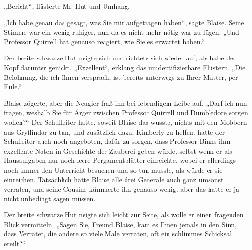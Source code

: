 „Bericht“, flüsterte Mr~Hut-und-Umhang.

„Ich habe genau das gesagt, was Sie mir aufgetragen haben“, sagte Blaise. Seine Stimme war ein wenig ruhiger, nun da es nicht mehr nötig war zu lügen.
„Und Professor Quirrell hat genauso reagiert, wie Sie es erwartet haben.“

Der breite schwarze Hut neigte sich und richtete sich wieder auf, als habe der Kopf darunter genickt.
„Exzellent“, erklang das unidentifizierbare Flüstern.
„Die Belohnung, die ich Ihnen versprach, ist bereits unterwegs zu Ihrer Mutter, per Eule.“

Blaise zögerte, aber die Neugier fraß ihn bei lebendigem Leibe auf.
„Darf ich nun fragen, weshalb Sie für Ärger zwischen Professor Quirrell und Dumbledore sorgen wollen?“ Der Schulleiter hatte, soweit Blaise das wusste, nichts mit den Mobbern aus Gryffindor zu tun, und zusätzlich dazu, Kimberly zu helfen, hatte der Schulleiter auch noch angeboten, dafür zu sorgen, dass Professor Binns ihm exzellente Noten in Geschichte der Zauberei geben würde, selbst wenn er als Hausaufgaben nur noch leere Pergamentblätter einreichte, wobei er allerdings noch immer den Unterricht besuchen und so tun musste, als würde er sie einreichen. Tatsächlich hätte Blaise alle drei Generäle auch ganz umsonst verraten, und seine Cousine kümmerte ihn genauso wenig, aber das hatte er ja nicht unbedingt sagen müssen.

Der breite schwarze Hut neigte sich leicht zur Seite, als wolle er einen fragenden Blick vermitteln.
„Sagen Sie, Freund Blaise, kam es Ihnen jemals in den Sinn, dass Verräter, die andere so viele Male verraten, oft ein schlimmes Schicksal ereilt?“

